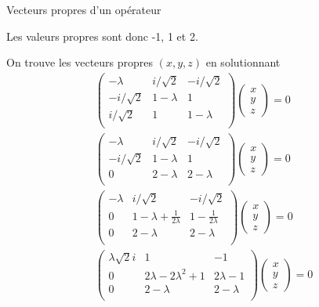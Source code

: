 \documentclass[12pt,solution=false]{uqtrassignment}
\begin{document}
\begin{problem}{Vecteurs propres d'un opérateur}
\begin{solution}
Les valeurs propres sont donc -1, 1 et 2.

On trouve les vecteurs propres $(x,y,z)$
  en solutionnant
\begin{align}
  \begin{pmatrix}
    -\lambda   &  i / \sqrt{2}  & -i/\sqrt{2}\\
    -i/\sqrt{2}   &   1-\lambda  & 1\\
     i/\sqrt{2}   &   1  & 1-\lambda\\
  \end{pmatrix}
  \begin{pmatrix}
    x\\
    y\\
    z
  \end{pmatrix}
  = 0\\[3mm]
  \begin{pmatrix}
    -\lambda   &  i / \sqrt{2}  & -i/\sqrt{2}\\
    -i/\sqrt{2}   &   1-\lambda  & 1\\
     0            &   2-\lambda  & 2-\lambda\\
  \end{pmatrix}
  \begin{pmatrix}
    x\\
    y\\
    z
  \end{pmatrix}
  = 0\\[3mm]
  \begin{pmatrix}
    -\lambda   &  i / \sqrt{2}  & -i/\sqrt{2}\\
     0            &   1-\lambda + \tfrac{1}{2\lambda}  & 1 - \tfrac{1}{2\lambda}\\
     0            &   2-\lambda  & 2-\lambda\\
  \end{pmatrix}
  \begin{pmatrix}
    x\\
    y\\
    z
  \end{pmatrix}
  = 0\\[3mm]
  \begin{pmatrix}
     \lambda \sqrt{2} i   &  1 & - 1\\
     0            &   2\lambda-2\lambda^2 + 1 & 2\lambda - 1\\
     0            &   2-\lambda  & 2-\lambda\\
  \end{pmatrix}
  \begin{pmatrix}
    x\\
    y\\
    z
  \end{pmatrix}
  = 0\\[3mm]
\end{align}


\end{solution}
\end{problem}
\end{document}
